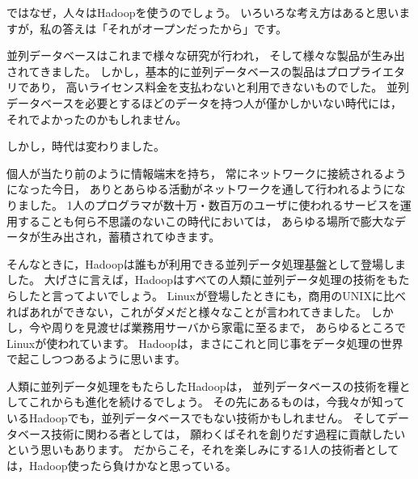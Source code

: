 ではなぜ，人々はHadoopを使うのでしょう。
いろいろな考え方はあると思いますが，私の答えは「それがオープンだったから」です。

並列データベースはこれまで様々な研究が行われ，
そして様々な製品が生み出されてきました。
しかし，基本的に並列データベースの製品はプロプライエタリであり，
高いライセンス料金を支払わないと利用できないものでした。
並列データベースを必要とするほどのデータを持つ人が僅かしかいない時代には，
それでよかったのかもしれません。

しかし，時代は変わりました。

個人が当たり前のように情報端末を持ち，
常にネットワークに接続されるようになった今日，
ありとあらゆる活動がネットワークを通して行われるようになりました。
1人のプログラマが数十万・数百万のユーザに使われるサービスを運用することも何ら不思議のないこの時代においては，
あらゆる場所で膨大なデータが生み出され，蓄積されてゆきます。

そんなときに，Hadoopは誰もが利用できる並列データ処理基盤として登場しました。
大げさに言えば，Hadoopはすべての人類に並列データ処理の技術をもたらしたと言ってよいでしょう。
Linuxが登場したときにも，商用のUNIXに比べればあれができない，これがダメだと様々なことが言われてきました。
しかし，今や周りを見渡せば業務用サーバから家電に至るまで，
あらゆるところでLinuxが使われています。
Hadoopは，まさにこれと同じ事をデータ処理の世界で起こしつつあるように思います。

人類に並列データ処理をもたらしたHadoopは，
並列データベースの技術を糧としてこれからも進化を続けるでしょう。
その先にあるものは，今我々が知っているHadoopでも，並列データベースでもない技術かもしれません。
そしてデータベース技術に関わる者としては，
願わくばそれを創りだす過程に貢献したいという思いもあります。
だからこそ，それを楽しみにする1人の技術者としては，Hadoop使ったら負けかなと思っている。
